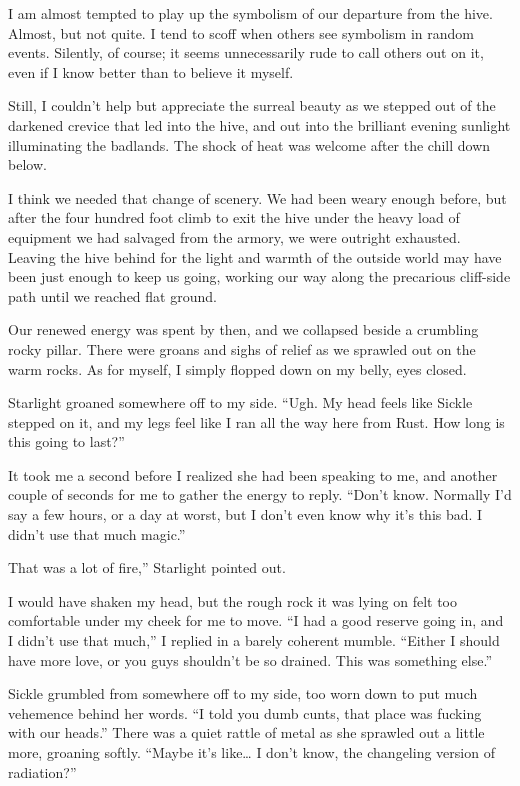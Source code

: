 I am almost tempted to play up the symbolism of our departure from the hive. Almost, but not quite. I tend to scoff when others see symbolism in random events. Silently, of course; it seems unnecessarily rude to call others out on it, even if I know better than to believe it myself.

Still, I couldn’t help but appreciate the surreal beauty as we stepped out of the darkened crevice that led into the hive, and out into the brilliant evening sunlight illuminating the badlands. The shock of heat was welcome after the chill down below.

I think we needed that change of scenery. We had been weary enough before, but after the four hundred foot climb to exit the hive under the heavy load of equipment we had salvaged from the armory, we were outright exhausted. Leaving the hive behind for the light and warmth of the outside world may have been just enough to keep us going, working our way along the precarious cliff-side path until we reached flat ground.

Our renewed energy was spent by then, and we collapsed beside a crumbling rocky pillar. There were groans and sighs of relief as we sprawled out on the warm rocks. As for myself, I simply flopped down on my belly, eyes closed.

Starlight groaned somewhere off to my side. “Ugh. My head feels like Sickle stepped on it, and my legs feel like I ran all the way here from Rust. How long is this going to last?”

It took me a second before I realized she had been speaking to me, and another couple of seconds for me to gather the energy to reply. “Don’t know. Normally I’d say a few hours, or a day at worst, but I don’t even know why it’s this bad. I didn’t use that much magic.”

\leavevmode{}That was a lot of fire,” Starlight pointed out.

I would have shaken my head, but the rough rock it was lying on felt too comfortable under my cheek for me to move. “I had a good reserve going in, and I didn’t use that much,” I replied in a barely coherent mumble. “Either I should have more love, or you guys shouldn’t be so drained. This was something else.”

Sickle grumbled from somewhere off to my side, too worn down to put much vehemence behind her words. “I told you dumb cunts, that place was fucking with our heads.” There was a quiet rattle of metal as she sprawled out a little more, groaning softly. “Maybe it’s like… I don’t know, the changeling version of radiation?”

